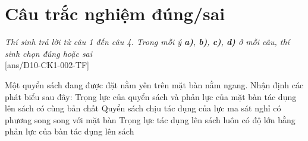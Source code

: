 \section{Câu trắc nghiệm đúng/sai} 
\textit{Thí sinh trả lời từ câu 1 đến câu 4. Trong mỗi ý \textbf{a)}, \textbf{b)}, \textbf{c)}, \textbf{d)} ở mỗi câu, thí sinh chọn đúng hoặc sai}
\setcounter{ex}{0}\\
[ans/D10-CK1-002-TF]
\begin{ex}
	Một quyển sách đang được đặt nằm yên trên mặt bàn nằm ngang.	Nhận định các phát biểu sau đây:
	{Trọng lực của quyển sách và phản lực của mặt bàn tác dụng lên sách có cùng bản chất}
	{Quyển sách chịu tác dụng của lực ma sát nghỉ có phương song song với mặt bàn}
	{Trọng lực tác dụng lên sách luôn có độ lớn bằng phản lực của bàn tác dụng lên sách}
	\loigiai{}
\end{ex}

